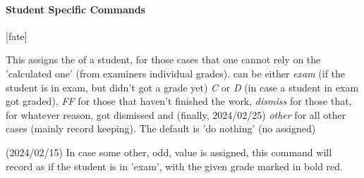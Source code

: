 \documentclass[article,nofontwarning,nogeometry,english,tocdepth=3,secdepth=3]{ufrgscca} %
\begin{document}

\paragraph{Student Specific Commands}\label{student-specific-commands}
\begin{codedescribe}[code,update=2023/11/18,update=2024/02/15,update=2024/02/25]{\studentfate}
	\begin{codesyntax}%
		\tsmacro{\studentfate}[fate]{}
	\end{codesyntax}
This assigns the  of a student, for those cases that one cannot rely on the 'calculated one' (from examiners individual grades).  can be either \emph{exam} (if the student is in exam, but didn't got a grade yet) \emph{C} or \emph{D} (in case a student in exam got graded), \emph{FF} for those that haven't finished the work, \emph{dismiss} for those that, for whatever reason, got dismissed and (finally, 2024/02/25) \emph{other} for all other cases (mainly record keeping). The default is 'do nothing' (no  assigned)
\end{codedescribe}
\begin{tsremark}
(2024/02/15) In case some other, odd, value is assigned, this command will record as if the student is in 'exam', with the given grade  marked in bold red.
\end{tsremark}
\end{document}
